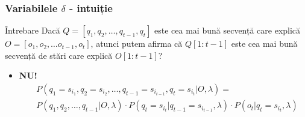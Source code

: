 \begin{frame}
  \frametitle{Variabilele $\delta$ - intuiție}
  \begin{block}{Întrebare}
    Dacă $Q = [q_1, q_2, \ldots, q_{t-1}, q_{t}]$ este cea mai bună secvență care explică $O = [o_1, o_2, \ldots o_{t-1}, o_{t}]$, atunci putem afirma că $Q[1:t-1]$ este cea mai bună secvență de stări care explică $O[1:t-1]$?
  \end{block}
  \pause
  \vspace*{1em}
  \begin{itemize}
  \item \textbf{NU!}
    \begin{align*}
        & P(q_1 = s_{i_1}, q_2 = s_{i_2}, \ldots, q_{t-1} = s_{i_{t-1}}, q_{t} = s_{i_{t}}\vert O, \lambda) = \\
        & P(q_1, q_2, \ldots, q_{t-1} \vert O, \lambda) \cdot  P(q_t = s_{i_t} \vert q_{t-1}= s_{i_{t-1}}, \lambda) \cdot P(o_t \vert q_t=s_{i_t}, \lambda)
      \end{align*}
    \end{itemize}
\end{frame}

